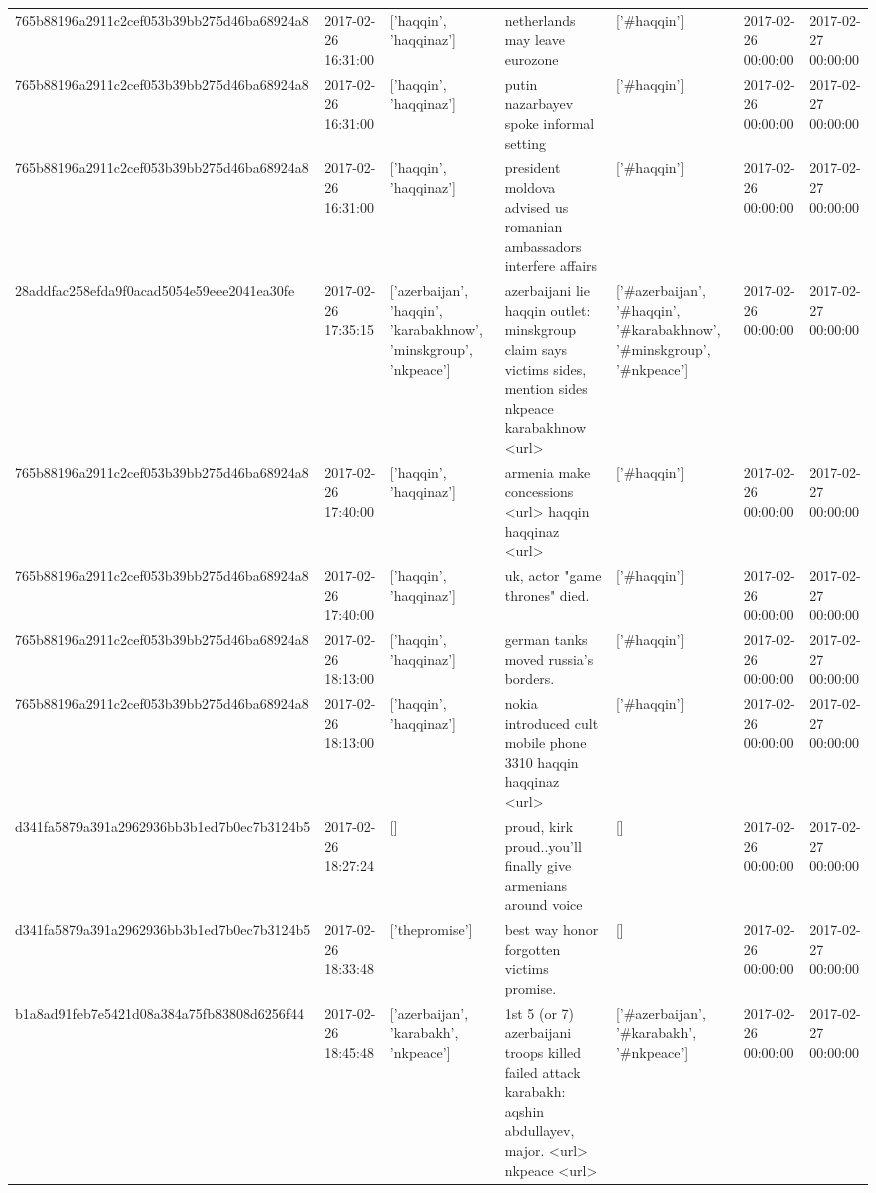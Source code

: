 \begin{tabular}{lllllll}
765b88196a2911c2cef053b39bb275d46ba68924a8 & 2017-02-26 16:31:00 & ['haqqin', 'haqqinaz'] & netherlands may leave eurozone & ['#haqqin'] & 2017-02-26 00:00:00 & 2017-02-27 00:00:00 \\
765b88196a2911c2cef053b39bb275d46ba68924a8 & 2017-02-26 16:31:00 & ['haqqin', 'haqqinaz'] & putin nazarbayev spoke informal setting & ['#haqqin'] & 2017-02-26 00:00:00 & 2017-02-27 00:00:00 \\
765b88196a2911c2cef053b39bb275d46ba68924a8 & 2017-02-26 16:31:00 & ['haqqin', 'haqqinaz'] & president moldova advised us romanian ambassadors interfere affairs & ['#haqqin'] & 2017-02-26 00:00:00 & 2017-02-27 00:00:00 \\
28addfac258efda9f0acad5054e59eee2041ea30fe & 2017-02-26 17:35:15 & ['azerbaijan', 'haqqin', 'karabakhnow', 'minskgroup', 'nkpeace'] & azerbaijani lie haqqin outlet: minskgroup claim says victims sides, mention sides nkpeace karabakhnow <url> & ['#azerbaijan', '#haqqin', '#karabakhnow', '#minskgroup', '#nkpeace'] & 2017-02-26 00:00:00 & 2017-02-27 00:00:00 \\
765b88196a2911c2cef053b39bb275d46ba68924a8 & 2017-02-26 17:40:00 & ['haqqin', 'haqqinaz'] & armenia make concessions <url> haqqin haqqinaz <url> & ['#haqqin'] & 2017-02-26 00:00:00 & 2017-02-27 00:00:00 \\
765b88196a2911c2cef053b39bb275d46ba68924a8 & 2017-02-26 17:40:00 & ['haqqin', 'haqqinaz'] & uk, actor "game thrones" died. & ['#haqqin'] & 2017-02-26 00:00:00 & 2017-02-27 00:00:00 \\
765b88196a2911c2cef053b39bb275d46ba68924a8 & 2017-02-26 18:13:00 & ['haqqin', 'haqqinaz'] & german tanks moved russia's borders. & ['#haqqin'] & 2017-02-26 00:00:00 & 2017-02-27 00:00:00 \\
765b88196a2911c2cef053b39bb275d46ba68924a8 & 2017-02-26 18:13:00 & ['haqqin', 'haqqinaz'] & nokia introduced cult mobile phone 3310 haqqin haqqinaz <url> & ['#haqqin'] & 2017-02-26 00:00:00 & 2017-02-27 00:00:00 \\
d341fa5879a391a2962936bb3b1ed7b0ec7b3124b5 & 2017-02-26 18:27:24 & [] & proud, kirk proud..you'll finally give armenians around voice🙏🏻 & [] & 2017-02-26 00:00:00 & 2017-02-27 00:00:00 \\
d341fa5879a391a2962936bb3b1ed7b0ec7b3124b5 & 2017-02-26 18:33:48 & ['thepromise'] & best way honor forgotten victims promise. & [] & 2017-02-26 00:00:00 & 2017-02-27 00:00:00 \\
b1a8ad91feb7e5421d08a384a75fb83808d6256f44 & 2017-02-26 18:45:48 & ['azerbaijan', 'karabakh', 'nkpeace'] & 1st 5 (or 7) azerbaijani troops killed failed attack karabakh: aqshin abdullayev, major. <url> nkpeace <url> & ['#azerbaijan', '#karabakh', '#nkpeace'] & 2017-02-26 00:00:00 & 2017-02-27 00:00:00 \\

\end{tabular}
